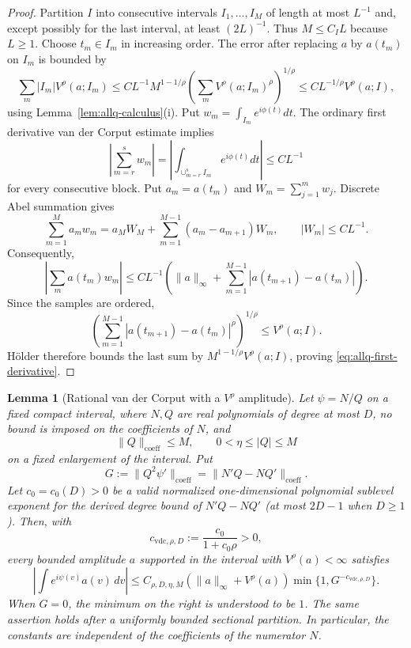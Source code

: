 \documentclass[11pt]{article}
\numberwithin{equation}{section}
\newtheorem{lemma}[theorem]{Lemma}
\theoremstyle{remark}
\theoremstyle{definition}
\begin{document}
\begin{proof}
Partition $I$ into consecutive intervals $I_1,\ldots,I_M$ of length at
most $L^{-1}$ and, except possibly for the last interval, at least
$(2L)^{-1}$.  Thus $M\le C_IL$ because $L\ge1$.  Choose
$t_m\in I_m$ in increasing order.  The error after replacing $a$ by
$a(t_m)$ on $I_m$ is bounded by
\[
 \sum_m|I_m|V^\rho(a;I_m)
 \le C L^{-1}M^{1-1/\rho}
 \left(\sum_mV^\rho(a;I_m)^\rho\right)^{1/\rho}
 \le C L^{-1/\rho}V^\rho(a;I),
\]
using Lemma~\ref{lem:allq-calculus}(i).  Put
$w_m=\int_{I_m}e^{i\phi(t)}dt$.  The ordinary first derivative van der
Corput estimate implies
\[
 \left|\sum_{m=r}^sw_m\right|
 =\left|\int_{\cup_{m=r}^sI_m}e^{i\phi(t)}dt\right|\le CL^{-1}
\]
for every consecutive block.  Put $a_m=a(t_m)$ and
$W_m=\sum_{j=1}^mw_j$.  Discrete Abel summation gives
\[
 \sum_{m=1}^Ma_mw_m
 =a_MW_M+\sum_{m=1}^{M-1}(a_m-a_{m+1})W_m,
 \qquad |W_m|\le CL^{-1}.
\]
Consequently,
\[
 \left|\sum_ma(t_m)w_m\right|
 \le CL^{-1}\left(\|a\|_\infty+
 \sum_{m=1}^{M-1}|a(t_{m+1})-a(t_m)|\right).
\]
Since the samples are ordered,
\[
 \left(\sum_{m=1}^{M-1}|a(t_{m+1})-a(t_m)|^\rho\right)^{1/\rho}
 \le V^\rho(a;I).
\]
H\"older therefore bounds the last sum by
$M^{1-1/\rho}V^\rho(a;I)$, proving
\eqref{eq:allq-first-derivative}.
\end{proof}

\begin{lemma}[Rational van der Corput with a $V^\rho$ amplitude]
\label{lem:allq-rational-vdc}
Let $\psi=N/Q$ on a fixed compact interval, where $N,Q$ are real
polynomials of degree at most $D$, no bound is imposed on the coefficients
of $N$, and
\[
 \|Q\|_{\mathrm{coeff}}\le M,
 \qquad 0<\eta\le |Q|\le M
\]
on a fixed enlargement of the interval. Put
\[
 G:=\|Q^2\psi'\|_{\mathrm{coeff}}
   =\|N'Q-NQ'\|_{\mathrm{coeff}}.
\]
Let $c_0=c_0(D)>0$ be a valid normalized one-dimensional polynomial
sublevel exponent for the derived degree bound of
$N'Q-NQ'$ (at most $2D-1$ when $D\ge1$). Then, with
\begin{equation}\label{eq:allq-vdc-explicit-exponent}
 c_{\mathrm{vdc},\rho,D}
 :=\frac{c_0}{1+c_0\rho}>0,
\end{equation}
every bounded amplitude $a$ supported in the interval with
$V^\rho(a)<\infty$ satisfies
\begin{equation}\label{eq:allq-rational-vdc}
 \left|\int e^{i\psi(v)}a(v)\,dv\right|
 \le C_{\rho,D,\eta,M}
 (\|a\|_\infty+V^\rho(a))
 \min\{1,G^{-c_{\mathrm{vdc},\rho,D}}\}.
\end{equation}
When $G=0$, the minimum on the right is understood to be $1$. The same
assertion holds after a uniformly bounded sectional partition. In
particular, the constants are independent of the coefficients of the
numerator $N$.
\end{lemma}
\end{document}
